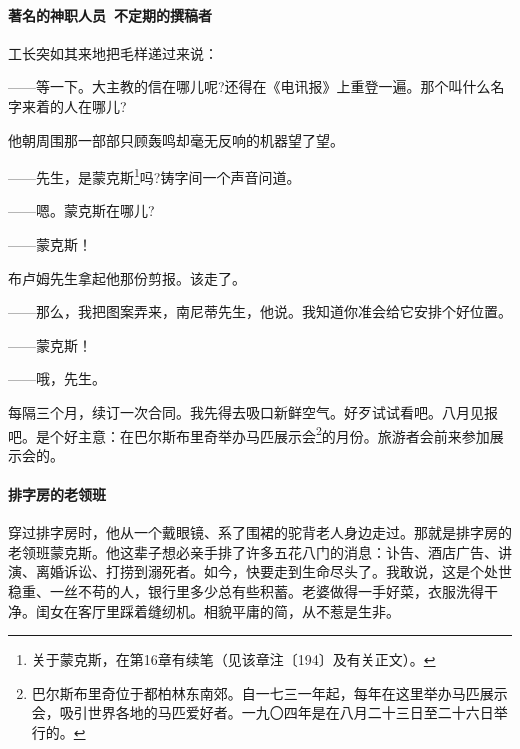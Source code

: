 \paragraph*{著名的神职人员\ 不定期的撰稿者}
\par 工长突如其来地把毛样递过来说：
\par ——等一下。大主教的信在哪儿呢?还得在《电讯报》上重登一遍。那个叫什么名字来着的人在哪儿?
\par 他朝周围那一部部只顾轰鸣却毫无反响的机器望了望。
\par ——先生，是蒙克斯\footnote{关于蒙克斯，在第16章有续笔（见该章注〔194〕及有关正文）。}吗?铸字间一个声音问道。
\par ——嗯。蒙克斯在哪儿?
\par ——蒙克斯！
\par 布卢姆先生拿起他那份剪报。该走了。
\par ——那么，我把图案弄来，南尼蒂先生，他说。我知道你准会给它安排个好位置。
\par ——蒙克斯！
\par ——哦，先生。
\par 每隔三个月，续订一次合同。我先得去吸口新鲜空气。好歹试试看吧。八月见报吧。是个好主意：在巴尔斯布里奇举办马匹展示会\footnote{巴尔斯布里奇位于都柏林东南郊。自一七三一年起，每年在这里举办马匹展示会，吸引世界各地的马匹爱好者。一九〇四年是在八月二十三日至二十六日举行的。}的月份。旅游者会前来参加展示会的。
\paragraph*{排字房的老领班}
\par 穿过排字房时，他从一个戴眼镜、系了围裙的驼背老人身边走过。那就是排字房的老领班蒙克斯。他这辈子想必亲手排了许多五花八门的消息：讣告、酒店广告、讲演、离婚诉讼、打捞到溺死者。如今，快要走到生命尽头了。我敢说，这是个处世稳重、一丝不苟的人，银行里多少总有些积蓄。老婆做得一手好菜，衣服洗得干净。闺女在客厅里踩着缝纫机。相貌平庸的简，从不惹是生非。

